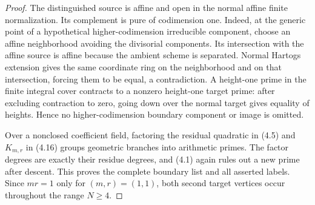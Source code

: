 \begin{proof}
The distinguished source is affine and open in the normal affine finite
normalization.  Its complement is pure of codimension one.  Indeed, at the
generic point of a hypothetical higher-codimension irreducible component,
choose an affine neighborhood avoiding the divisorial components.  Its
intersection with the affine source is affine because the ambient scheme is
separated.  Normal Hartogs extension gives the same coordinate ring on the
neighborhood and on that intersection, forcing them to be equal, a
contradiction.  A height-one prime in the finite integral cover contracts to
a nonzero height-one target prime: after excluding contraction to zero,
going down over the normal target gives equality of heights.  Hence no
higher-codimension boundary component or image is omitted.

Over a nonclosed coefficient field, factoring the residual quadratic in
(4.5) and $K_{m,r}$ in (4.16) groups geometric branches into arithmetic
primes.  The factor degrees are exactly their residue degrees, and (4.1)
again rules out a new prime after descent.  This proves the complete boundary
list and all asserted labels.  Since $mr=1$ only for $(m,r)=(1,1)$, both
second target vertices occur throughout the range $N\ge4$.

\end{proof}

